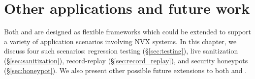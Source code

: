 \chapter{Other applications and future work}
\label{chap:applications}

Both \mx and \varan are designed as flexible frameworks which could be extended
to support a variety of application scenarios involving NVX systems. In this
chapter, we discuss four such scenarios: regression testing
(\S\ref{sec:testing}), live sanitization (\S\ref{sec:sanitization}),
record-replay (\S\ref{sec:record_replay}), and security honeypots
(\S\ref{sec:honeypot}). We also present other possible future extensions to
both \mx and \varan.









